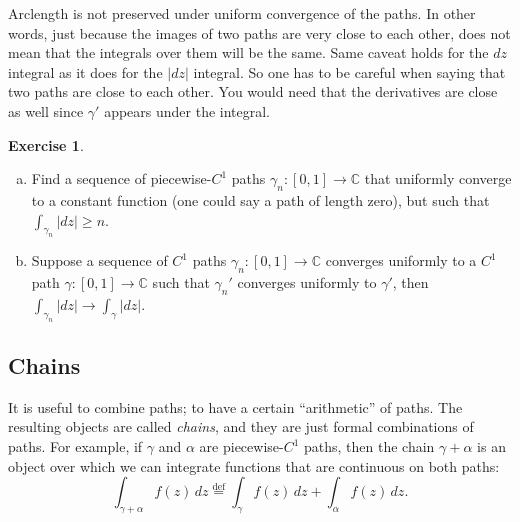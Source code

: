 \documentclass[12pt,openany]{book}
\newcommand{\sabs}[1]{\lvert {#1} \rvert}
\newcommand{\C}{{\mathbb{C}}}
\newcommand{\myquote}[1]{``#1''}
\theoremstyle{plain}
\theoremstyle{remark}
\theoremstyle{definition}
\newenvironment{exbox}{%
    \def\FrameCommand{\vrule width 1pt \relax\hspace{10pt}}%
    \MakeFramed{\advance\hsize-\width\FrameRestore}%
}{%
    \endMakeFramed
}
\newenvironment{exparts}{%
    \leavevmode\begin{enumerate}[a),noitemsep,topsep=0pt,parsep=0pt,partopsep=0pt]
}{%
    \end{enumerate}
}
\theoremstyle{exercise}
\newtheorem{exercise}{Exercise}[section]
\theoremstyle{example}
\begin{document}
Arclength is not preserved under uniform convergence of the paths.
In other words, just because the images of two paths are very close to each
other, does not mean that the integrals over them will be the same.
Same caveat holds for the $dz$ integral as it does for the $\sabs{dz}$
integral.
So one has to be careful when saying that two paths are close to each other.
You would need that the derivatives are close as well since $\gamma'$ appears
under the integral.

\begin{exbox}
\begin{exercise}
\begin{exparts}
\item
Find a sequence of piecewise-$C^1$ paths $\gamma_n \colon [0,1] \to \C$
that uniformly converge to a constant function (one could say a path of
length zero), but such that $\int_{\gamma_n} \sabs{dz} \geq n$.
\item
Suppose a sequence of $C^1$ paths $\gamma_n \colon [0,1] \to \C$
converges uniformly to a $C^1$ path $\gamma \colon [0,1] \to \C$
such that $\gamma_n'$ converges uniformly to $\gamma'$, then
$\int_{\gamma_n} \sabs{dz} \to
\int_{\gamma} \sabs{dz}$.
\end{exparts}
\end{exercise}
\end{exbox}

\subsection{Chains}

It is useful to combine paths; to have a certain \myquote{arithmetic} of paths.
The resulting objects are called \emph{chains}, and they
are just formal combinations of paths.  For example, if $\gamma$
and $\alpha$ are piecewise-$C^1$ paths, then the chain  $\gamma+\alpha$
is an object over which we can integrate functions that are continuous
on both paths:
\begin{equation*}
\int_{\gamma + \alpha} f(z) \, dz
\overset{\text{def}}{=}
\int_{\gamma} f(z) \, dz +
\int_{\alpha} f(z) \, dz .
\end{equation*}
\end{document}
